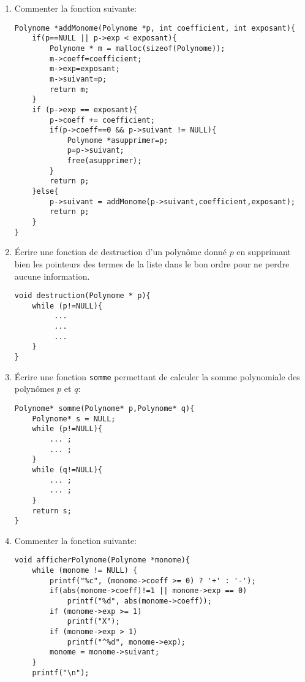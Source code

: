 \documentclass[a4paper]{article}
\begin{document}
\begin{enumerate}
\item %
Commenter la fonction suivante:
\begin{verbatim}
Polynome *addMonome(Polynome *p, int coefficient, int exposant){
    if(p==NULL || p->exp < exposant){
        Polynome * m = malloc(sizeof(Polynome));
        m->coeff=coefficient;
        m->exp=exposant;
        m->suivant=p;
        return m;
    }
    if (p->exp == exposant){
        p->coeff += coefficient;
        if(p->coeff==0 && p->suivant != NULL){
            Polynome *asupprimer=p;
            p=p->suivant;
            free(asupprimer);
        }
        return p;
    }else{
        p->suivant = addMonome(p->suivant,coefficient,exposant);
        return p;
    }
}
\end{verbatim}
\item  %
Écrire une fonction de destruction d'un polynôme donné $p$ en supprimant bien les pointeurs des termes de la liste dans le bon ordre pour ne perdre aucune information.
\begin{verbatim}
void destruction(Polynome * p){
    while (p!=NULL){
         ...
         ...
         ...
    }
}
\end{verbatim}
\item Écrire une fonction {\tt somme} permettant de calculer la somme polynomiale des polynômes $p$ et $q$:
\begin{verbatim}
Polynome* somme(Polynome* p,Polynome* q){
    Polynome* s = NULL;
    while (p!=NULL){
        ... ;
        ... ;
    }
    while (q!=NULL){
        ... ;
        ... ;
    }
    return s;
}
\end{verbatim}
\item Commenter la fonction suivante:
\begin{verbatim}
void afficherPolynome(Polynome *monome){
    while (monome != NULL) {
        printf("%c", (monome->coeff >= 0) ? '+' : '-');
        if(abs(monome->coeff)!=1 || monome->exp == 0)
            printf("%d", abs(monome->coeff));
        if (monome->exp >= 1)
            printf("X");
        if (monome->exp > 1)
            printf("^%d", monome->exp);
        monome = monome->suivant;
    }
    printf("\n");


\end{verbatim}
\end{enumerate}
\end{document}

